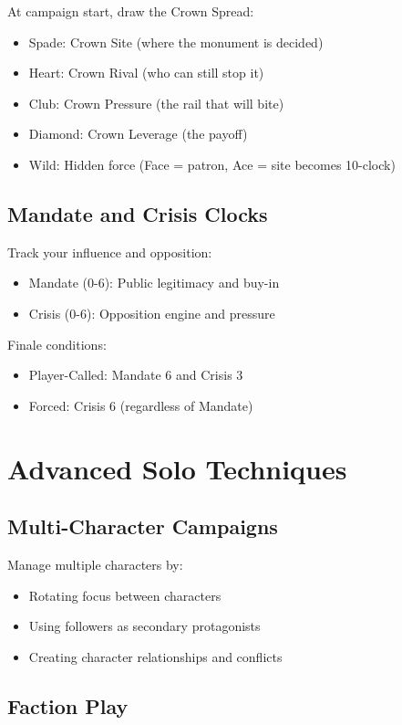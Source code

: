 \documentclass[11pt]{article}
\begin{document}
At campaign start, draw the Crown Spread:
\begin{itemize}
    \item Spade: Crown Site (where the monument is decided)
    \item Heart: Crown Rival (who can still stop it)
    \item Club: Crown Pressure (the rail that will bite)
    \item Diamond: Crown Leverage (the payoff)
    \item Wild: Hidden force (Face = patron, Ace = site becomes 10-clock)
\end{itemize}

\subsection{Mandate and Crisis Clocks}

Track your influence and opposition:
\begin{itemize}
    \item Mandate (0-6): Public legitimacy and buy-in
    \item Crisis (0-6): Opposition engine and pressure
\end{itemize}

Finale conditions:
\begin{itemize}
    \item Player-Called: Mandate 6 and Crisis 3
    \item Forced: Crisis 6 (regardless of Mandate)
\end{itemize}

\section{Advanced Solo Techniques}

\subsection{Multi-Character Campaigns}

Manage multiple characters by:
\begin{itemize}
    \item Rotating focus between characters
    \item Using followers as secondary protagonists
    \item Creating character relationships and conflicts
\end{itemize}

\subsection{Faction Play}
\end{document}
